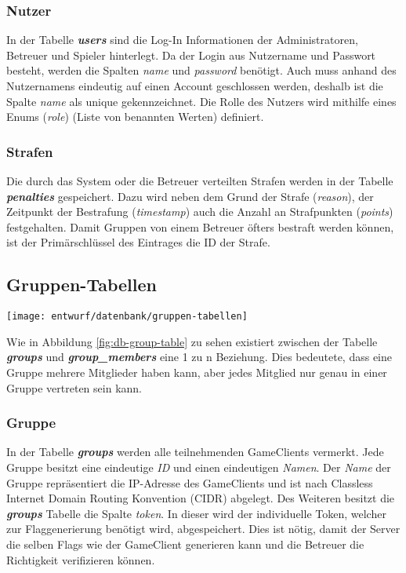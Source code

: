 \subsubsection{Nutzer}
In der Tabelle \textbf{\textit{users}} sind die Log-In Informationen der Administratoren, Betreuer und Spieler hinterlegt. Da der Login aus Nutzername und Passwort besteht, werden die Spalten \textit{name} und \textit{password} benötigt. Auch muss anhand des Nutzernamens eindeutig auf einen Account geschlossen werden, deshalb ist die Spalte \textit{name} als unique gekennzeichnet. Die Rolle des Nutzers wird mithilfe eines Enums (\textit{role}) (Liste von benannten Werten) definiert.

\subsubsection{Strafen}
Die durch das System oder die Betreuer verteilten Strafen werden in der Tabelle \textbf{\textit{penalties}} gespeichert. Dazu wird neben dem Grund der Strafe (\textit{reason}), der Zeitpunkt der Bestrafung (\textit{timestamp}) auch die Anzahl an Strafpunkten (\textit{points}) festgehalten. Damit Gruppen von einem Betreuer öfters bestraft werden können, ist der Primärschlüssel des Eintrages die ID der Strafe.

\subsection{Gruppen-Tabellen}
\begin{center}
	\texttt{[image: entwurf/datenbank/gruppen-tabellen]}
	\label{fig:db-group-table}
\end{center}

Wie in Abbildung \ref{fig:db-group-table} zu sehen existiert zwischen der Tabelle \textbf{\textit{groups}} und \textbf{\textit{group\_members}} eine 1 zu n Beziehung. Dies bedeutete, dass eine Gruppe mehrere Mitglieder haben kann, aber jedes Mitglied nur genau in einer Gruppe vertreten sein kann.

\subsubsection{Gruppe}
In der Tabelle \textbf{\textit{groups}} werden alle teilnehmenden GameClients vermerkt. Jede Gruppe besitzt eine eindeutige \textit{ID} und einen eindeutigen \textit{Namen}. Der \textit{Name} der Gruppe repräsentiert die IP-Adresse des GameClients und ist nach Classless Internet Domain Routing Konvention (CIDR) abgelegt. Des Weiteren besitzt die \textbf{\textit{groups}} Tabelle die Spalte \textit{token}. In dieser wird der individuelle Token, welcher zur Flaggenerierung benötigt wird, abgespeichert. Dies ist nötig, damit der Server die selben Flags wie der GameClient generieren kann und die Betreuer die Richtigkeit verifizieren können.

